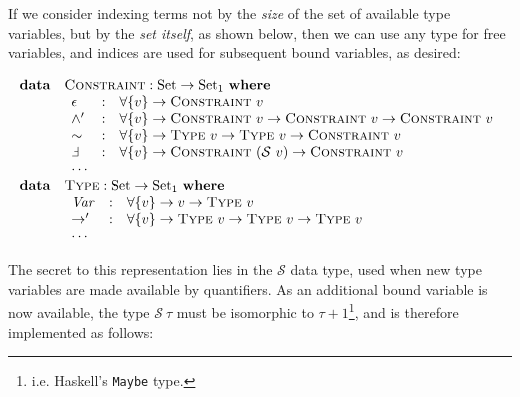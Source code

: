\documentclass[a4paper]{jfp}
\begin{document}
If we consider indexing terms not by the \emph{size} of the set of available type variables, but by the \emph{set itself}, as shown below, then we can use any type for free variables, and indices are used for subsequent bound variables, as desired:

\begin{displaymath}   
	\begin{array}{ll}
		\textbf{data} & \textsc{Constraint} : \text{Set} \rightarrow \text{Set}_1\ \textbf{where} \\
		              & \begin{array}{lcl}
                         \epsilon & : & \forall \{ v \} \rightarrow \textsc{Constraint}\ v \\
						 \land'   & : & \forall \{ v \} \rightarrow \textsc{Constraint}\ v \rightarrow \textsc{Constraint}\ v \rightarrow \textsc{Constraint}\ v \\
						 \sim     & : & \forall \{ v \} \rightarrow \textsc{Type}\ v \rightarrow \textsc{Type}\ v \rightarrow \textsc{Constraint}\ v \\
						 \Finv    & : & \forall \{ v \} \rightarrow \textsc{Constraint}\ (\mathcal{S}\ v) \rightarrow \textsc{Constraint}\ v \\
						 \cdots \\
					    \end{array} \\
		\textbf{data} & \textsc{Type} : \text{Set} \rightarrow \text{Set}_1\ \textbf{where} \\
		              & \begin{array}{lcl}
                         \mathit{Var} & : & \forall \{ v \} \rightarrow v \rightarrow \textsc{Type}\ v \\
						 \rightarrow' & : & \forall \{ v \} \rightarrow \textsc{Type}\ v \rightarrow \textsc{Type}\ v \rightarrow \textsc{Type}\ v \\
						 \cdots \\
					    \end{array} \\						
     \end{array}
\end{displaymath}	 

The secret to this representation lies in the $\mathcal{S}$ data type, used when new type variables are made available by quantifiers. As an additional bound variable is now available, the type $\mathcal{S}\ \tau$ must be isomorphic to $\tau + 1$\footnote{i.e. Haskell's {\tt Maybe} type.}, and is therefore implemented as follows:
\end{document}

